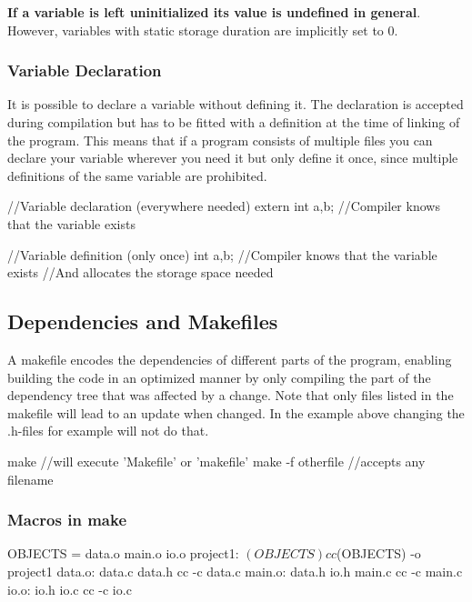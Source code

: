 \documentclass[10pt,a4paper]{scrartcl}
\begin{document}
\begin{multicols*}{2}
\textbf{If a variable is left uninitialized its value is undefined in general}. However, variables with static storage duration are implicitly set to 0.

\subsubsection{Variable Declaration}

It is possible to declare a variable without defining it. The declaration is accepted during compilation but has to be fitted with a definition at the time of linking of the program. This means that if a program consists of multiple files you can declare your variable wherever you need it but only define it once, since multiple definitions of the same variable are prohibited.

\begin{TPCpp}
//Variable declaration (everywhere needed)
extern int a,b; //Compiler knows that the variable exists

//Variable definition (only once)
int a,b; //Compiler knows that the variable exists
         //And allocates the storage space needed
\end{TPCpp}

\subsection{Dependencies and Makefiles}


A makefile encodes the dependencies of different parts of the program, enabling building the code in an optimized manner by only compiling the part of the dependency tree that was affected by a change. Note that only files listed in the makefile will lead to an update when changed. In the example above changing the .h-files for example will not do that.

\begin{TPCpp}
make //will execute 'Makefile' or 'makefile'
make -f otherfile //accepts any filename
\end{TPCpp}

\subsubsection{Macros in make}

\begin{TPCpp}
OBJECTS = data.o main.o io.o
project1: $(OBJECTS)
	cc $(OBJECTS) -o project1
data.o: data.c data.h
	cc -c data.c
main.o: data.h io.h main.c
	cc -c main.c
io.o: io.h io.c
	cc -c io.c
\end{TPCpp}


\end{multicols*}
\end{document}
